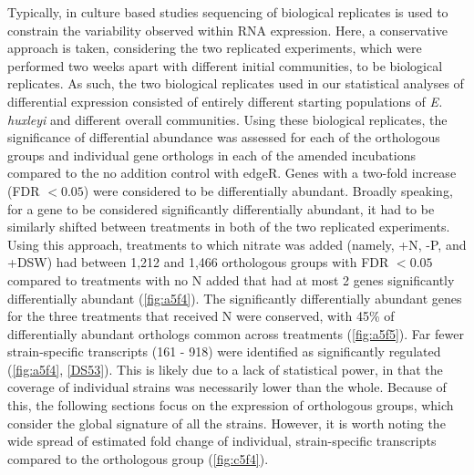 Typically, in culture based studies sequencing of biological replicates is used to constrain the variability observed within RNA expression. Here, a conservative approach is taken, considering the two replicated experiments, which were performed two weeks apart with different initial communities, to be biological replicates. As such, the two biological replicates used in our statistical analyses of differential expression consisted of entirely different starting populations of \textit{E. huxleyi} and different overall communities.  Using these biological replicates, the significance of differential abundance was assessed for each of the orthologous groups and individual gene orthologs in each of the amended incubations compared to the no addition control with edgeR. Genes with a two-fold increase (FDR $< 0.05$) were considered to be differentially abundant. Broadly speaking, for a gene to be considered significantly differentially abundant, it had to be similarly shifted between treatments in both of the two replicated experiments. Using this approach, treatments to which nitrate was added (namely, +N, -P, and +DSW) had between 1,212 and 1,466 orthologous groups with FDR $< 0.05$ compared to treatments with no N added that had at most 2 genes significantly differentially abundant (\cref{fig:a5f4}). The significantly differentially abundant genes for the three treatments that received N were conserved, with 45\% of differentially abundant orthologs common across treatments (\cref{fig:a5f5}). Far fewer strain-specific transcripts (161 - 918) were identified as significantly regulated (\cref{fig:a5f4}, \ref{DS53}). This is likely due to a lack of statistical power, in that the coverage of individual strains was necessarily lower than the whole. Because of this, the following sections focus on the expression of orthologous groups, which consider the global signature of all the strains. However, it is worth noting the wide spread of estimated fold change of individual, strain-specific transcripts compared to the orthologous group (\cref{fig:c5f4}). \par

